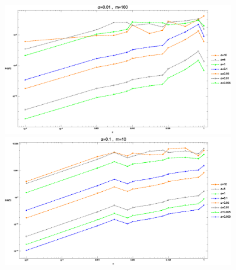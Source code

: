 \documentclass[hyperref]{ctexart}
\begin{document}
\begin{figure}[!htbp]
\begin{minipage}[t]{0.5\linewidth}
  \centering
  \includegraphics[width=0.9\textwidth]{Test_Coulomb_2_Various_a_1.eps}
\end{minipage}
\begin{minipage}[t]{0.5\linewidth}
  \centering
  \includegraphics[width=0.9\textwidth]{Test_Coulomb_3_Various_a_1.eps}
\end{minipage}\\


\end{figure}
\end{document}
